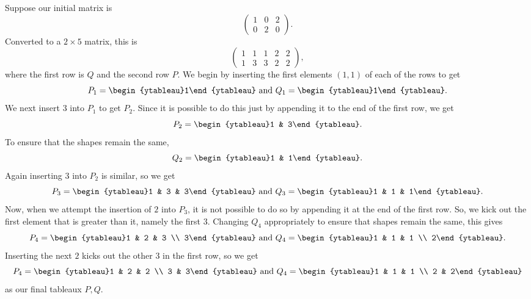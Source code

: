 	\begin{fex}
		Suppose our initial matrix is
		\[
		\begin{pmatrix}
			1 & 0 & 2 \\
			0 & 2 & 0
		\end{pmatrix}.
		\]
		Converted to a $2 \times 5$ matrix, this is
		\[
		\begin{pmatrix}
			1 & 1 & 1 & 2 & 2 \\
			1 & 3 & 3 & 2 & 2
		\end{pmatrix},
		\]
		where the first row is $Q$ and the second row $P$.
		We begin by inserting the first elements $(1,1)$ of each of the rows to get
		\[ P_1 = \begin{ytableau}1\end{ytableau} \text{ and } Q_1 = \begin{ytableau}1\end{ytableau}. \] 
		We next insert $3$ into $P_1$ to get $P_2$. Since it is possible to do this just by appending it to the end of the first row, we get
		\[ P_2 = \begin{ytableau}1 & 3\end{ytableau}. \]
		To ensure that the shapes remain the same,
		\[ Q_2 = \begin{ytableau}1 & 1\end{ytableau}. \]
		Again inserting $3$ into $P_2$ is similar, so we get
		\[ P_3 = \begin{ytableau}1 & 3 & 3\end{ytableau} \text{ and } Q_3 = \begin{ytableau}1 & 1 & 1\end{ytableau}. \]
		Now, when we attempt the insertion of $2$ into $P_3$, it is not possible to do so by appending it at the end of the first row. So, we kick out the first element that is greater than it, namely the first $3$. Changing $Q_4$ appropriately to ensure that shapes remain the same, this gives
		\[ P_4 = \begin{ytableau}1 & 2 & 3 \\ 3\end{ytableau} \text{ and } Q_4 = \begin{ytableau}1 & 1 & 1 \\ 2\end{ytableau}. \]
		Inserting the next $2$ kicks out the other $3$ in the first row, so we get
		\[ P_4 = \begin{ytableau}1 & 2 & 2 \\ 3 & 3\end{ytableau} \text{ and } Q_4 = \begin{ytableau}1 & 1 & 1 \\ 2 & 2\end{ytableau} \]
		as our final tableaux $P,Q$.
	\end{fex}

